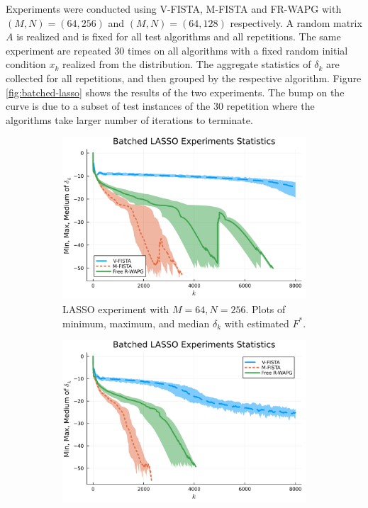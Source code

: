 \documentclass[12pt]{article}
\begin{document}
            Experiments were conducted using V-FISTA, M-FISTA and FR-WAPG with $(M, N) = (64, 256)$ and $(M, N) = (64, 128)$ respectively.
            A random matrix $A$ is realized and is fixed for all test algorithms and all repetitions.
            The same experiment are repeated 30 times on all algorithms with a fixed random initial condition $x_k$ realized from the distribution.
            The aggregate statistics of $\delta_k$ are collected for all repetitions, and then grouped by the respective algorithm.
            Figure \ref{fig:batched-lasso} shows the results of the two experiments.
            The bump on the curve is due to a subset of test instances of the 30 repetition where the algorithms take larger number of iterations to terminate.
            \begin{figure}[H]
                \begin{subfigure}[b]{0.47\textwidth}
                    \centering
                    \includegraphics[width=\textwidth]{assets/lasso_batched_statistics_64-256.png}
                    \caption{LASSO experiment with $M = 64, N = 256$. Plots of minimum, maximum, and median $\delta_k$ with estimated $F^*$. }
                \end{subfigure}
                \hfill
                \begin{subfigure}[b]{0.47\textwidth}
                    \centering
                    \includegraphics[width=\textwidth]{assets/lasso_batched_statistics_64-128.png}

\end{subfigure}
\end{figure}
\end{document}
